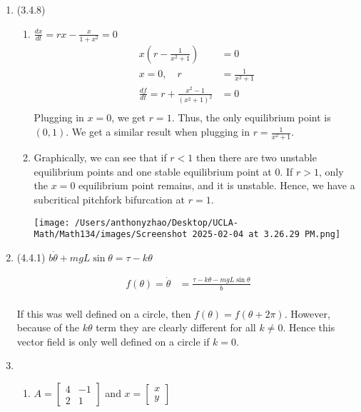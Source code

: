 \documentclass[12pt]{article}
\begin{document}

\begin{enumerate}[start=1,label={\bfseries Problem \arabic*:},leftmargin=1in] %
    \item (3.4.8) 
    \begin{enumerate}
        \item $\frac{dx}{dt} = rx - \frac{x}{1+x^{2}} = 0$
    \begin{align*}
        x(r - \frac{1}{x^{2}+1}) &= 0\\
        x = 0, \quad r &= \frac{1}{x^{2}+1} \\
        \frac{df}{dt} = r + \frac{x^{2} - 1}{(x^{2} + 1)^{2}} &= 0\\
    \end{align*}
    Plugging in $x = 0$, we get $r = 1$. Thus, the only equilibrium point is $(0,1)$. We get a similar result when plugging in $r = \frac{1}{x^{2}+1}$. 

        \item Graphically, we can see that if $r < 1$ then there are two unstable equilibrium points and one stable equilibrium point at 0. 
        If $r > 1$, only the $x = 0$ equilibrium point remains, and it is unstable. Hence, we have a subcritical pitchfork bifurcation at $r = 1$.

        \texttt{[image: /Users/anthonyzhao/Desktop/UCLA-Math/Math134/images/Screenshot 2025-02-04 at 3.26.29 PM.png]}
    \end{enumerate}
    
    \item (4.4.1) $b\dot{\theta} + mgL\sin\theta = \tau - k\theta$
    
    \begin{align*}
       f(\theta) = \dot{\theta} &= \frac{\tau - k\theta - mgL\sin\theta}{b}\\
    \end{align*}

    If this was well defined on a circle, then $f(\theta) = f(\theta + 2\pi)$. However, because of the $k\theta$ term they are clearly different for all $k \neq 0$. 
Hence this vector field is only well defined on a circle if $k = 0$.  

    \item \begin{enumerate}
        \item $A = \begin{bmatrix}
            4 & -1 \\ 
            2 & 1 
        \end{bmatrix}$ and $x = \begin{bmatrix}
            x \\ y
        \end{bmatrix}$ 


\end{enumerate}
\end{enumerate}
\end{document}
